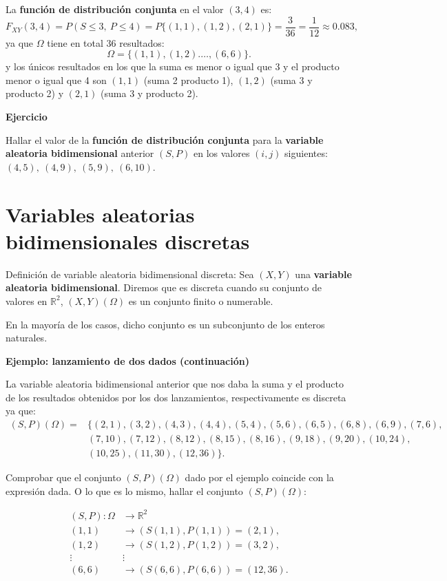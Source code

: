 \documentclass[]{book}
\begin{document}
La \textbf{función de distribución conjunta} en el valor \((3,4)\) es:
\[
F_{XY}(3,4) = P(S\leq 3,\ P\leq 4)=P\{(1,1), (1,2), (2,1) \}=\frac{3}{36}=\frac{1}{12}\approx 0.083, 
\]
ya que \(\Omega\) tiene en total \(36\) resultados:
\[
\Omega =\{(1,1),(1,2).\ldots, (6,6)\}.
\]
y los únicos resultados en los que la suma es menor o igual que 3 y el producto menor o igual que 4 son \((1,1)\) (suma 2 producto 1), \((1,2)\) (suma 3 y producto 2) y \((2,1)\) (suma 3 y producto 2).

\textbf{Ejercicio}

Hallar el valor de la \textbf{función de distribución conjunta} para la \textbf{variable aleatoria bidimensional} anterior \((S,P)\) en los valores \((i,j)\) siguientes: \((4,5),\ (4,9),\ (5,9),\ (6,10)\).

\hypertarget{variables-aleatorias-bidimensionales-discretas}{%
\section{Variables aleatorias bidimensionales discretas}\label{variables-aleatorias-bidimensionales-discretas}}

Definición de variable aleatoria bidimensional discreta:
Sea \((X,Y)\) una \textbf{variable aleatoria bidimensional}. Diremos
que es discreta cuando su conjunto de valores en \(\mathbb{R}^2\), \((X,Y)(\Omega)\) es un conjunto finito o numerable.

En la mayoría de los casos, dicho conjunto es un subconjunto de los enteros naturales.

\textbf{Ejemplo: lanzamiento de dos dados (continuación)}

La variable aleatoria bidimensional anterior que nos daba la suma y el producto de los resultados obtenidos por los dos lanzamientos, respectivamente es discreta ya que:
\[
\begin{array}{rl}
(S,P)(\Omega) =&\{(2,1),(3,2),(4,3),(4,4),(5,4),(5,6),(6,5),(6,8),(6,9),(7,6),\\ & 
(7,10),(7,12),(8,12), (8,15),(8,16),(9,18),(9,20),(10,24),\\ & (10,25),(11,30), (12,36)\}.
\end{array}
\]

Comprobar que el conjunto \((S,P)(\Omega)\) dado por el ejemplo coincide con la expresión dada.
O lo que es lo mismo, hallar el conjunto \((S,P)(\Omega)\):

\[
\begin{array}{rl}
(S,P): \Omega & \longrightarrow \mathbb{R}^2\\
(1,1) & \longrightarrow (S(1,1),P(1,1))=(2,1),\\
(1,2) & \longrightarrow (S(1,2),P(1,2))=(3,2),\\
\vdots & \vdots \\
(6,6) & \longrightarrow (S(6,6),P(6,6))=(12,36).
\end{array}
\]
\end{document}
